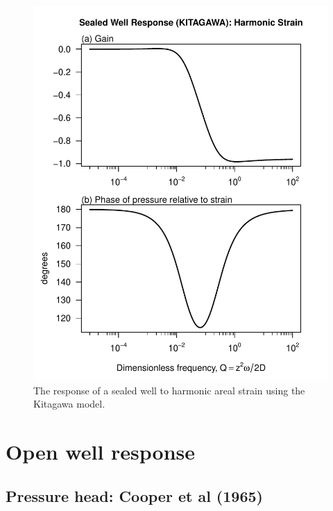 \documentclass[10pt]{article}\usepackage[]{graphicx}\usepackage[]{color}
\makeatletter
\def\maxwidth{ %
  \ifdim\Gin@nat@width>\linewidth
    \linewidth
  \else
    \Gin@nat@width
  \fi
}
\newenvironment{knitrout}{}{} %
\makeatother
\begin{document}
\begin{figure}[htb!]
\begin{center}
\begin{knitrout}
\color{fgcolor}
\includegraphics[width=\maxwidth]{figure/KITRESPFIG} 

\end{knitrout}

\caption{The response of a sealed well to harmonic areal strain using
the Kitagawa model. 
}
\label{fig:wrsp}
\end{center}
\end{figure}

\section{Open well response}

\subsection{Pressure head: Cooper et al (1965)}
\citet{cooper1965}
\end{document}
